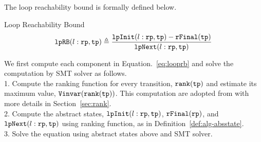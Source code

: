 The loop reachability bound is formally defined below. 

\begin{defn}
    \label{def:looprb}
    Loop Reachability Bound
    \begin{equation}
        \label{eq:looprb}
      {\mathtt{lpRB}}(l: {\mathtt{rp}}, {\mathtt{tp}}) \triangleq
        \frac{{\mathtt{lpInit}}(l: {\mathtt{rp}}, {\mathtt{tp}}) - {\mathtt{rFinal}}({\mathtt{tp}})}{{\mathtt{lpNext}}(l: {\mathtt{rp}}, {\mathtt{tp}})}
    \end{equation}
  \end{defn}

  We first compute each component in Equation.~\ref{eq:looprb}
  and solve the computation by SMT solver as follows.
  \\
  1. Compute the ranking function for every transition, ${\mathtt{rank}}({\mathtt{tp}})$ and estimate its maximum value,
  ${{\mathtt{Vinvar}}}({\mathtt{rank}}({\mathtt{tp}}))$.
  This computation are adopted from \cite{sinn2017complexity} with more details in Section~\ref{sec:rank}.
  \\
  2. Compute the abstract states,  ${\mathtt{lpInit}}(l: {\mathtt{rp}}, {\mathtt{tp}})$,
  ${\mathtt{rFinal}}({\mathtt{rp}})$, and ${\mathtt{lpNext}}(l: {\mathtt{rp}}, {\mathtt{tp}})$ using ranking function,
  as in Definition~\ref{def:alg-absstate}.
  \\
  3. Solve the equation using abstract states above and SMT solver.
%
